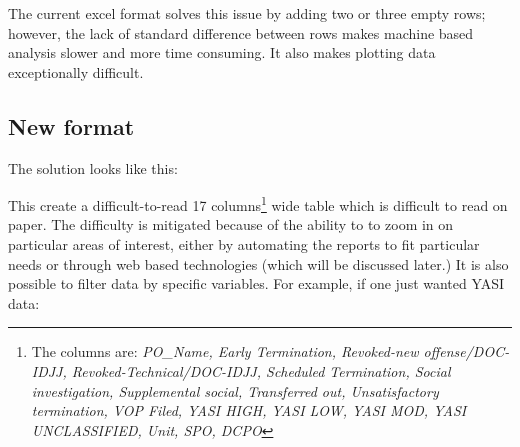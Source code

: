 \documentclass[12pt,]{article}
\let\rmarkdownfootnote\footnote%
\def\footnote{\protect\rmarkdownfootnote}
\begin{document}
The current excel format solves this issue by adding two or three empty
rows; however, the lack of standard difference between rows makes
machine based analysis slower and more time consuming. It also makes
plotting data exceptionally difficult.

\newpage

\begin{landscape}

\hypertarget{new-format}{%
\subsection{New format}\label{new-format}}

The solution looks like this:

\begin{table}[!h]

\caption{\label{tab:tidy}GBO: September, 2018}
\centering
{}
\end{table}

This create a difficult-to-read 17 columns\footnote{The columns are:
  \emph{PO\_Name, Early Termination, Revoked-new offense/DOC-IDJJ,
  Revoked-Technical/DOC-IDJJ, Scheduled Termination, Social
  investigation, Supplemental social, Transferred out, Unsatisfactory
  termination, VOP Filed, YASI HIGH, YASI LOW, YASI MOD, YASI
  UNCLASSIFIED, Unit, SPO, DCPO}} wide table which is difficult to read
on paper. The difficulty is mitigated because of the ability to to zoom
in on particular areas of interest, either by automating the reports to
fit particular needs or through web based technologies (which will be
discussed later.) It is also possible to filter data by specific
variables. For example, if one just wanted YASI data:


\end{landscape}
\end{document}
